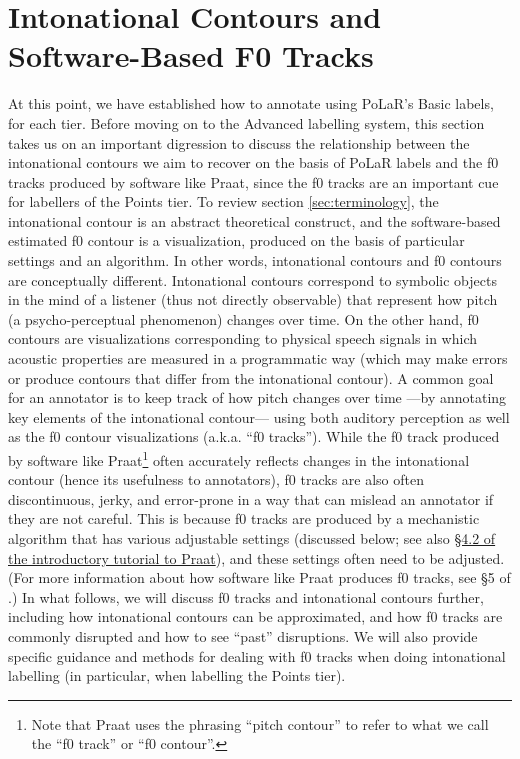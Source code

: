 \documentclass[11pt, twoside]{memoir}
\begin{document}
{{{\section{Intonational Contours and Software-Based F0 Tracks}\label{sec:intonational-contours-and-software-based-pitch-tracks}
At this point, we have established how to annotate using PoLaR’s Basic labels, for each tier. Before moving on to the Advanced labelling system, this section takes us on an important digression to discuss the relationship between the intonational contours we aim to recover on the basis of PoLaR labels and the f0 tracks produced by software like Praat, since the f0 tracks are an important cue for labellers of the Points tier.
To review section \ref{sec:terminology}, the intonational contour is an abstract theoretical construct, and the software-based estimated f0 contour is a visualization, produced on the basis of particular settings and an algorithm. In other words, intonational contours and f0 contours are conceptually different. Intonational contours correspond to symbolic objects in the mind of a listener (thus not directly observable) that represent how pitch (a psycho-perceptual phenomenon) changes over time. On the other hand, f0 contours are visualizations corresponding to physical speech signals in which acoustic properties are measured in a programmatic way (which may make errors or produce contours that differ from the intonational contour).
A common goal for an annotator is to keep track of how pitch changes over time —by annotating key elements of the intonational contour— using both auditory perception as well as the f0 contour visualizations (a.k.a. “f0 tracks”). While the f0 track produced by software like Praat\footnote{Note that Praat uses the phrasing “pitch contour” to refer to what we call the “f0 track” or “f0 contour”.} often accurately reflects changes in the intonational contour (hence its usefulness to annotators), f0 tracks are also often discontinuous, jerky, and error-prone in a way that can mislead an annotator if they are not careful. This is because f0 tracks are produced by a mechanistic algorithm that has various adjustable settings (discussed below; see also \href{https://www.fon.hum.uva.nl/praat/manual/Intro_4_2__Configuring_the_pitch_contour.html}{§4.2 of the introductory tutorial to Praat}), and these settings often need to be adjusted. (For more information about how software like Praat produces f0 tracks, see §5 of \citealt{weenink20}.)
In what follows, we will discuss f0 tracks and intonational contours further, including how intonational contours can be approximated, and how f0 tracks are commonly disrupted and how to see “past” disruptions. We will also provide specific guidance and methods for dealing with f0 tracks when doing intonational labelling (in particular, when labelling the Points tier).
}}}
\end{document}
